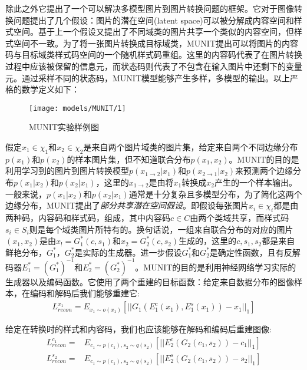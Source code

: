 除此之外它提出了一个可以解决多模型图片到图片转换问题的框架。它对于图像转换问题提出了几个假设：图片的潜在空间(latent space)可以被分解成内容空间和样式空间。基于上一个假设又提出了不同域类的图片共享一个类似的内容空间，但样式空间不一致。为了将一张图片转换成目标域类，MUNIT提出可以将图片的内容码与目标域类样式码空间的一个随机样式码重组。这里的内容码代表了在图片转换过程中应该被保留的信息元，而状态码则代表了不包含在输入图片中还剩下的变量元。通过采样不同的状态码，MUNIT模型能够产生多样，多模型的输出。以上严格的数学定义如下：

\begin{figure}[t]
    \centering
    \texttt{[image: models/MUNIT/1]}
    \caption{MUNIT实验样例图}
    \label{fig:munit}
\end{figure}

假定$x_1\in \chi_1$和$x_2\in \chi_2$是来自两个图片域类的图片集，给定来自两个不同边缘分布$p(x_1)$和$p(x_2)$的样本图片集，但不知道联合分布$p(x_1, x_2)$。MUNIT的目的是利用学习到的图片到图片转换模型$p(x_{1\to 2}|x_1)$和$p(x_{2\to 1}|x_2)$来预测两个边缘分布$p(x_1|x_2)$和$p(x_2|x_1)$，这里的$x_{1\to 2}$是由将$x_1$转换成$x_2$产生的一个样本输出。一般来说，$p(x_1|x_2)$和$p(x_2|x_1)$通常是十分复杂且多模型分布，为了简化这两个边缘分布，MUNIT提出了\textit{部分共享潜在空间假设}。即假设每张图片$x_i\in \chi_i$都是由两种码，内容码和样式码，组成，其中内容码$c\in C$由两个类域共享，而样式码$s_i\in S_i$则是每个域类图片所特有的。换句话说，一组来自联合分布的对应的图片$(x_1, x_2)$是由$x_!=G_1^*(c,s_1)$和$x_2=G_2^*(c, s_2)$生成的，这里的$c,s_1,s_2$都是来自鲜艳分布，$G_1^*，G_2^*$是实际的生成器。进一步假设$G_1^*$和$G_2^*$是确定性函数，且有反解码器$E_1^*=(G_1^*)^{-1}$和$E_2^*=(G_2^*)^{-1}$。MUNIT的目的是利用神经网络学习实际的生成器以及编码函数。它使用了两个重建的目标函数：给定来自数据分布的图像样本，在编码和解码后我们能够重建它:
\begin{gather}
    L_{recon}^{x_1}=E_{x_1\sim o(x_1)}[||G_1(E_1^c(x_1), E_1^s(x_1))-x_1||_1] 
\end{gather}

给定在转换时的样式和内容码，我们也应该能够在解码和编码后重建图像:
\begin{equation}
    \begin{aligned}
        L_{recon}^{c_1}= & E_{c_1\sim p(c_1), s_2\sim q(s_2)}[||E_2^c(G_2(c_1,s_2))-c_1||_1] \\
    L_{recon}^{s_2}= & E_{c_1\sim p(c_1), s_2\sim q(s_2)}[||E_2^s(G_2(c_1, s_2))-s_2||_1]
    \end{aligned}
\end{equation}

